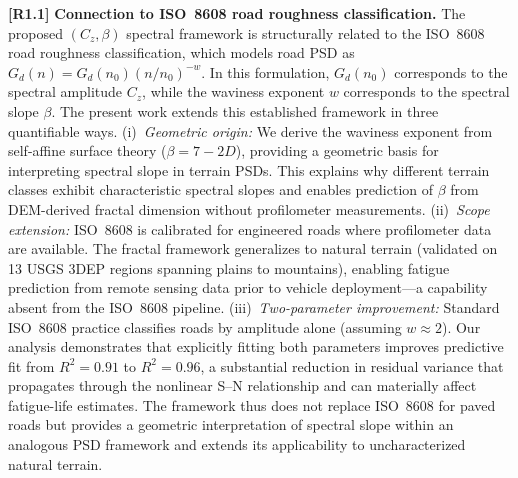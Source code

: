 \documentclass[11pt]{article}
\begin{document}
{\color{revisionblue}
\textbf{[R1.1]} \textbf{Connection to ISO~8608 road roughness classification.} The proposed $(C_z, \beta)$ spectral framework is structurally related to the ISO~8608 road roughness classification, which models road PSD as $G_d(n) = G_d(n_0)(n/n_0)^{-w}$. In this formulation, $G_d(n_0)$ corresponds to the spectral amplitude $C_z$, while the waviness exponent $w$ corresponds to the spectral slope $\beta$. The present work extends this established framework in three quantifiable ways. (i)~\emph{Geometric origin:} We derive the waviness exponent from self-affine surface theory ($\beta = 7-2D$), providing a geometric basis for interpreting spectral slope in terrain PSDs. This explains why different terrain classes exhibit characteristic spectral slopes and enables prediction of $\beta$ from DEM-derived fractal dimension without profilometer measurements. (ii)~\emph{Scope extension:} ISO~8608 is calibrated for engineered roads where profilometer data are available. The fractal framework generalizes to natural terrain (validated on 13 USGS 3DEP regions spanning plains to mountains), enabling fatigue prediction from remote sensing data prior to vehicle deployment---a capability absent from the ISO~8608 pipeline. (iii)~\emph{Two-parameter improvement:} Standard ISO~8608 practice classifies roads by amplitude alone (assuming $w \approx 2$). Our analysis demonstrates that explicitly fitting both parameters improves predictive fit from $R^2 = 0.91$ to $R^2 = 0.96$, a substantial reduction in residual variance that propagates through the nonlinear S--N relationship and can materially affect fatigue-life estimates. The framework thus does not replace ISO~8608 for paved roads but provides a geometric interpretation of spectral slope within an analogous PSD framework and extends its applicability to uncharacterized natural terrain.
}
\end{document}
